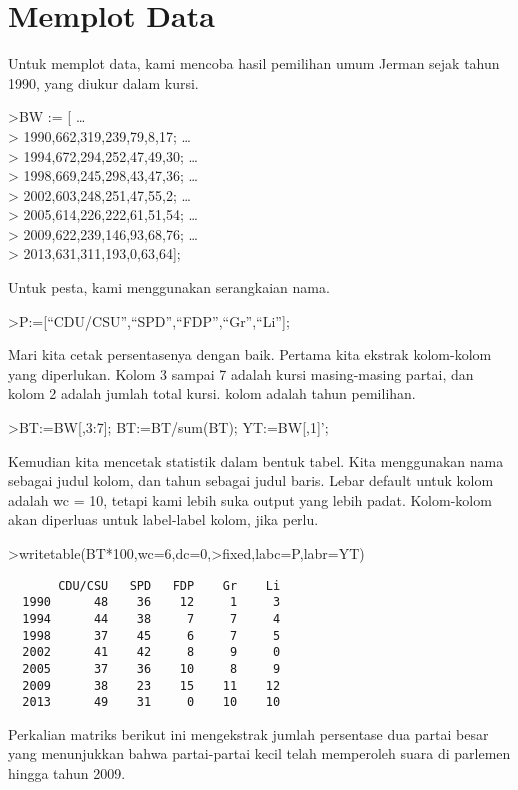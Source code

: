 \documentclass[
]{book}
\begin{document}
\section{Memplot Data}\label{memplot-data}

Untuk memplot data, kami mencoba hasil pemilihan umum Jerman sejak tahun 1990, yang diukur dalam kursi.

\textgreater BW := {[} \ldots{}\\
\textgreater{} 1990,662,319,239,79,8,17; \ldots{}\\
\textgreater{} 1994,672,294,252,47,49,30; \ldots{}\\
\textgreater{} 1998,669,245,298,43,47,36; \ldots{}\\
\textgreater{} 2002,603,248,251,47,55,2; \ldots{}\\
\textgreater{} 2005,614,226,222,61,51,54; \ldots{}\\
\textgreater{} 2009,622,239,146,93,68,76; \ldots{}\\
\textgreater{} 2013,631,311,193,0,63,64{]};

Untuk pesta, kami menggunakan serangkaian nama.

\textgreater P:={[}``CDU/CSU'',``SPD'',``FDP'',``Gr'',``Li''{]};

Mari kita cetak persentasenya dengan baik. Pertama kita ekstrak kolom-kolom yang diperlukan. Kolom 3 sampai 7 adalah kursi masing-masing partai, dan kolom 2 adalah jumlah total kursi. kolom adalah tahun pemilihan.

\textgreater BT:=BW{[},3:7{]}; BT:=BT/sum(BT); YT:=BW{[},1{]}';

Kemudian kita mencetak statistik dalam bentuk tabel. Kita menggunakan nama sebagai judul kolom, dan tahun sebagai judul baris. Lebar default untuk kolom adalah wc = 10, tetapi kami lebih suka output yang lebih padat. Kolom-kolom akan diperluas untuk label-label kolom, jika perlu.

\textgreater writetable(BT*100,wc=6,dc=0,\textgreater fixed,labc=P,labr=YT)

\begin{verbatim}
       CDU/CSU   SPD   FDP    Gr    Li
  1990      48    36    12     1     3
  1994      44    38     7     7     4
  1998      37    45     6     7     5
  2002      41    42     8     9     0
  2005      37    36    10     8     9
  2009      38    23    15    11    12
  2013      49    31     0    10    10
\end{verbatim}

Perkalian matriks berikut ini mengekstrak jumlah persentase dua partai besar yang menunjukkan bahwa partai-partai kecil telah memperoleh suara di parlemen hingga tahun 2009.
\end{document}
